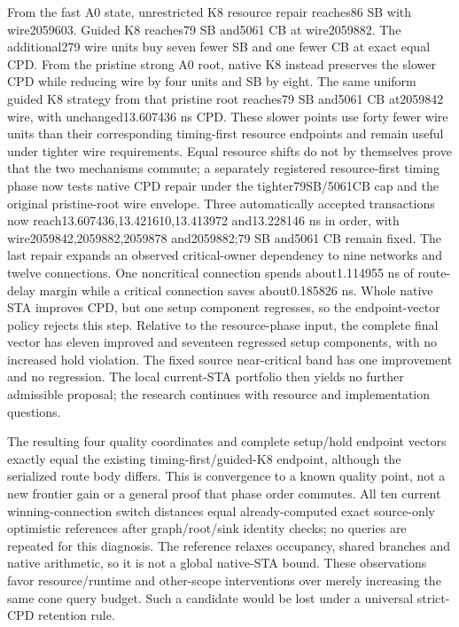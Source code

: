 \documentclass[conference,10pt]{IEEEtran}
\begin{document}
From the fast A0 state, unrestricted K8 resource repair reaches86 SB with wire2059603. Guided K8 reaches79 SB and5061 CB at wire2059882. The additional279 wire units buy seven fewer SB and one fewer CB at exact equal CPD. From the pristine strong A0 root, native K8 instead preserves the slower CPD while reducing wire by four units and SB by eight. The same uniform guided K8 strategy from that pristine root reaches79 SB and5061 CB at2059842 wire, with unchanged13.607436 ns CPD. These slower points use forty fewer wire units than their corresponding timing-first resource endpoints and remain useful under tighter wire requirements. Equal resource shifts do not by themselves prove that the two mechanisms commute; a separately registered resource-first timing phase now tests native CPD repair under the tighter79SB/5061CB cap and the original pristine-root wire envelope. Three automatically accepted transactions now reach13.607436,13.421610,13.413972 and13.228146 ns in order, with wire2059842,2059882,2059878 and2059882;79 SB and5061 CB remain fixed. The last repair expands an observed critical-owner dependency to nine networks and twelve connections. One noncritical connection spends about1.114955 ns of route-delay margin while a critical connection saves about0.185826 ns. Whole native STA improves CPD, but one setup component regresses, so the endpoint-vector policy rejects this step. Relative to the resource-phase input, the complete final vector has eleven improved and seventeen regressed setup components, with no increased hold violation. The fixed source near-critical band has one improvement and no regression. The local current-STA portfolio then yields no further admissible proposal; the research continues with resource and implementation questions.

The resulting four quality coordinates and complete setup/hold endpoint vectors exactly equal the existing timing-first/guided-K8 endpoint, although the serialized route body differs. This is convergence to a known quality point, not a new frontier gain or a general proof that phase order commutes. All ten current winning-connection switch distances equal already-computed exact source-only optimistic references after graph/root/sink identity checks; no queries are repeated for this diagnosis. The reference relaxes occupancy, shared branches and native arithmetic, so it is not a global native-STA bound. These observations favor resource/runtime and other-scope interventions over merely increasing the same cone query budget. Such a candidate would be lost under a universal strict-CPD retention rule.
\end{document}
